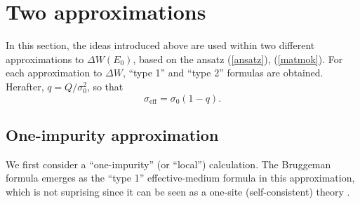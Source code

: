 \section{Two approximations}
\label{tm}
In this section, the ideas introduced above are used within two
different approximations to $\Delta W(E_0)$, based on the ansatz
(\ref{ansatz}), (\ref{matmok}). For each approximation to $\Delta W$,
``type 1'' and ``type 2'' formulas are obtained.  Herafter,
$q=Q/\sigma_0^2$, so that
\begin{equation}
\label{sigefq}
\sigma_{\text{eff}}=\sigma_0(1-q).
\end{equation}

\subsection{One-impurity approximation}
\label{oia}

We first consider a ``one-impurity'' (or ``local'') calculation. The
Bruggeman formula emerges as the ``type 1'' effective-medium formula
in this approximation, which is not suprising since it can be seen as
a one-site (self-consistent) theory \cite{HORI75,LUCK91}.


